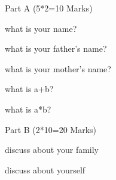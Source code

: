 \documentclass{article}
\begin{document}
Part A (5*2=10 Marks)

what is your name?

what is your father's name?

what is your mother's name?

what is a+b?

what is a*b?

Part B (2*10=20 Marks)

discuss about your family

discuss about yourself
\end{document}
